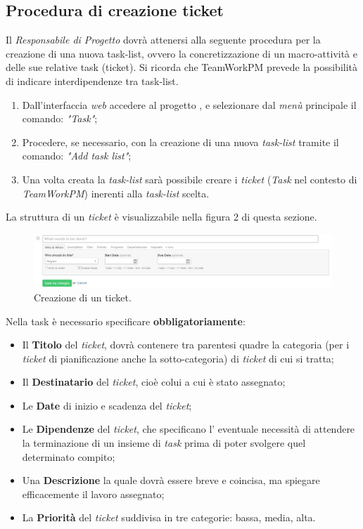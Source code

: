 \subsection{Procedura di creazione ticket} 
Il \textit{Responsabile di Progetto} dovrà attenersi alla seguente procedura per la creazione di una nuova task-list, ovvero la concretizzazione di un macro-attività e delle sue relative task (ticket). Si ricorda che TeamWorkPM prevede la possibilità di indicare interdipendenze tra task-list.
\begin{enumerate}
\item Dall'interfaccia \textit{web} accedere al progetto \progetto{}, e selezionare dal \textit{menù} principale il comando: \emph{"Task"};
\item Procedere, se necessario, con la creazione di una nuova \textit{task-list} tramite il comando: \emph{"Add task list"};
\item Una volta creata la \textit{task-list} sarà possibile creare i \textit{ticket} (\textit{Task} nel contesto di \textit{TeamWorkPM}) inerenti alla \textit{task-list} scelta.
\end{enumerate}

La struttura di un \textit{ticket} è visualizzabile nella figura 2 di questa sezione.
\begin{figure}
\centering
\includegraphics[width=%
\linewidth]{immaginiNDP/creazionetask}
\caption[]{Creazione di un ticket.}
\label{fig:creazionetask}
\end{figure}

Nella task è necessario specificare \textbf{obbligatoriamente}:
\begin{itemize}
\item Il \textbf{Titolo} del \textit{ticket}, dovrà contenere tra parentesi quadre la categoria (per i \textit{ticket} di pianificazione anche la sotto-categoria) di \textit{ticket} di cui si tratta;
\item Il \textbf{Destinatario} del \textit{ticket}, cioè colui a cui è stato assegnato;
\item Le \textbf{Date} di inizio e scadenza del \textit{ticket};
\item Le \textbf{Dipendenze} del \textit{ticket}, che specificano l' eventuale necessità di attendere la terminazione di un insieme di \textit{task} prima di poter svolgere quel determinato compito;
\item Una \textbf{Descrizione} la quale dovrà essere breve e coincisa, ma spiegare efficacemente il lavoro assegnato;
\item La \textbf{Priorità} del \textit{ticket} suddivisa in tre categorie: bassa, media, alta.
\end{itemize}

